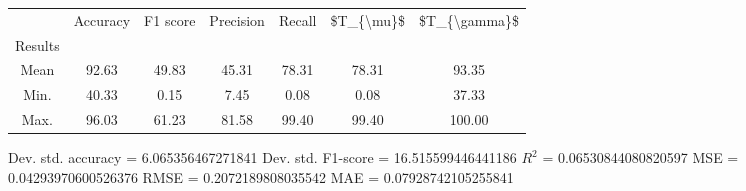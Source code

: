 \begin{tabular}{|c|c|c|c|c|c|c|}
\toprule
{} &  Accuracy &  F1 score &  Precision &  Recall &  \$T\_\{\textbackslash mu\}\$ &  \$T\_\{\textbackslash gamma\}\$ \\
Results &           &           &            &         &            &               \\
\hline
Mean    &     92.63 &     49.83 &      45.31 &   78.31 &      78.31 &         93.35 \\
Min.    &     40.33 &      0.15 &       7.45 &    0.08 &       0.08 &         37.33 \\
Max.    &     96.03 &     61.23 &      81.58 &   99.40 &      99.40 &        100.00 \\
\bottomrule
\end{tabular}

 Dev. std. accuracy = 6.065356467271841
 Dev. std. F1-score = 16.515599446441186
 $R^2$ = 0.06530844080820597
 MSE = 0.04293970600526376
 RMSE = 0.2072189808035542
 MAE = 0.07928742105255841
